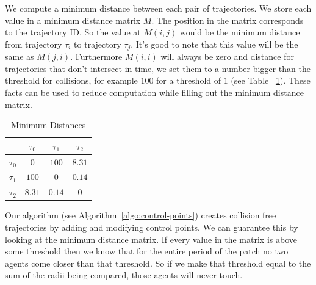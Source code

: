 We compute a minimum distance between each pair of trajectories. We store each value in a minimum distance matrix $M$. The position in the matrix corresponds to the trajectory ID. So the value at $M(i, j)$ would be the minimum distance from trajectory $\tau_i$ to trajectory $\tau_j$. It's good to note that this value will be the same as $M(j,i)$. Furthermore $M(i,i)$ will always be zero and distance for trajectories that don't intersect in time, we set them to a number bigger than the threshold for collisions, for example $100$ for a threshold of $1$ (see Table ~\ref{tab:minimum-distances}). These facts can be used to reduce computation while filling out the minimum distance matrix.

\begin{table}[b]

	\caption{Minimum Distances}
	\begin{tabular}{|c||c|c|c|}
		\hline
		 & $\tau_0$	& $\tau_1$ & $\tau_2$\\ \hline \hline
		$\tau_0$	& $0$		&	$100$ & $8.31$\\  \hline
		$\tau_1$	& $100$		&	$0$ & $0.14$\\  \hline
		$\tau_2$	& $8.31$		&	$0.14$ & $0$\\
		\hline
		\end{tabular}
\label{tab:minimum-distances}
\end{table}


Our algorithm (see Algorithm~\ref{algo:control-points}) creates collision free trajectories by adding and modifying control points. We can guarantee this by looking at the minimum distance matrix. If every value in the matrix is above some threshold then we know that for the entire period of the patch no two agents come closer than that threshold. So if we make that threshold equal to the sum of the radii being compared, those agents will never touch.



